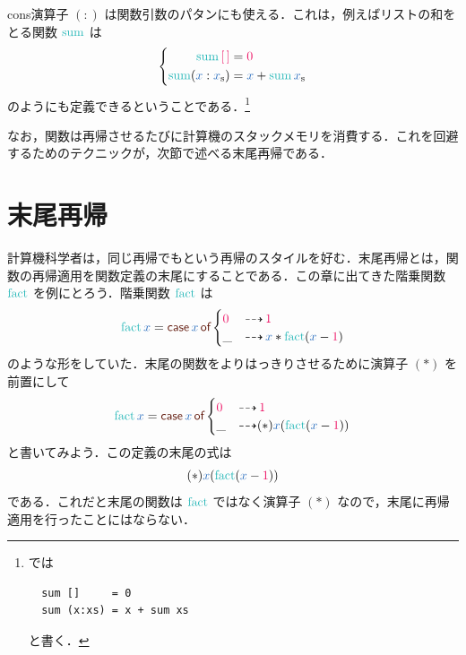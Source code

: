 \documentclass[a5paper,twoside,fleqn,draft]{jsbook}
\begin{document}
\separator

cons演算子 $(:)$ は関数引数のパタンにも使える．これは，例えばリストの和をとる関数 $\hSum$ は
\begin{equation}
  \left\{
  \begin{aligned}
    \hSum{\hEmptyList}
    &=\hConstant{0}\\
    \hSum(\hVar{x}:\hListVar{x})
    &=\hVar{x}+\hSum\hListVar{x}
  \end{aligned}
  \right.
\end{equation}
のようにも定義できるということである．\footnote{\haskell では
\begin{verbatim}
  sum []     = 0
  sum (x:xs) = x + sum xs
\end{verbatim}
と書く．}

なお，関数は再帰させるたびに計算機のスタックメモリを消費する．これを回避するためのテクニックが，次節で述べる末尾再帰である．

\section{末尾再帰}

計算機科学者は，同じ再帰でもという再帰のスタイルを好む．末尾再帰とは，関数の再帰適用を関数定義の末尾にすることである．この章に出てきた階乗関数 $\hFact$ を例にとろう．階乗関数 $\hFact$ は
\begin{equation}
  \hFact\hVar{x}
  =\hCaseSyntax{\hVar{x}}\begin{cases}
    \hConstant{0}
    &\hIfSo\hConstant{1}\\
    \_
    &\hIfSo\hVar{x}*\hFact(\hVar{x}-\hConstant{1})
  \end{cases}
\end{equation}
のような形をしていた．末尾の関数をよりはっきりさせるために演算子 $(*)$ を前置にして
\begin{equation}
  \hFact\hVar{x}
  =\hCaseSyntax{\hVar{x}}
  \begin{cases}
    \hConstant{0}
    &\hIfSo\hConstant{1}\\
    \_
    &\hIfSo(*)\hVar{x}(\hFact(\hVar{x}-\hConstant{1}))
  \end{cases}
\end{equation}
と書いてみよう．この定義の末尾の式は
\begin{equation}
  (*)\hVar{x}(\hFact(\hVar{x}-\hConstant{1}))
\end{equation}
である．これだと末尾の関数は $\hFact$ ではなく演算子 $(*)$ なので，末尾に再帰適用を行ったことにはならない．
\end{document}
